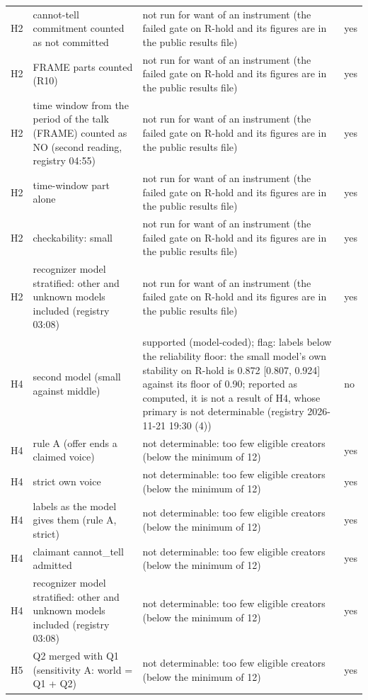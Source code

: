 {\begin{tabular}{@{}lp{}p{}l@{}}
H2 & cannot-tell commitment counted as not committed & not run for want of an instrument (the failed gate on R-hold and its figures are in the public results file) & yes \\
H2 & FRAME parts counted (R10) & not run for want of an instrument (the failed gate on R-hold and its figures are in the public results file) & yes \\
H2 & time window from the period of the talk (FRAME) counted as NO (second reading, registry 04:55) & not run for want of an instrument (the failed gate on R-hold and its figures are in the public results file) & yes \\
H2 & time-window part alone & not run for want of an instrument (the failed gate on R-hold and its figures are in the public results file) & yes \\
H2 & checkability: small & not run for want of an instrument (the failed gate on R-hold and its figures are in the public results file) & yes \\
H2 & recognizer model stratified: other and unknown models included (registry 03:08) & not run for want of an instrument (the failed gate on R-hold and its figures are in the public results file) & yes \\
H4 & second model (small against middle) & supported (model-coded); flag: labels below the reliability floor: the small model's own stability on R-hold is 0.872 [0.807, 0.924] against its floor of 0.90; reported as computed, it is not a result of H4, whose primary is not determinable (registry 2026-11-21 19:30 (4)) & no \\
H4 & rule A (offer ends a claimed voice) & not determinable: too few eligible creators (below the minimum of 12) & yes \\
H4 & strict own voice & not determinable: too few eligible creators (below the minimum of 12) & yes \\
H4 & labels as the model gives them (rule A, strict) & not determinable: too few eligible creators (below the minimum of 12) & yes \\
H4 & claimant cannot\_tell admitted & not determinable: too few eligible creators (below the minimum of 12) & yes \\
H4 & recognizer model stratified: other and unknown models included (registry 03:08) & not determinable: too few eligible creators (below the minimum of 12) & yes \\
H5 & Q2 merged with Q1 (sensitivity A: world = Q1 + Q2) & not determinable: too few eligible creators (below the minimum of 12) & yes \\

\end{tabular}}
